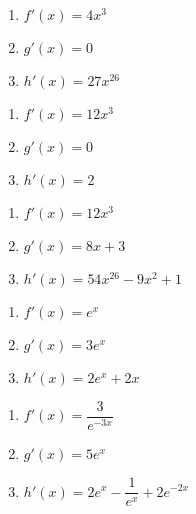 \documentclass[a4paper, 12pt]{article}
\begin{document}
\begin{facit}
    \begin{multicols}{3}
        \begin{enumerate}
            \item $f'(x) = 4x^3$
            \item $g'(x) = 0$
            \item $h'(x) = 27x^{26}$
        \end{enumerate}
    \end{multicols}
\end{facit}

\begin{facit}
    \begin{multicols}{3}
        \begin{enumerate}
            \item $f'(x) = 12x^3$
            \item $g'(x) = 0$
            \item $h'(x) = 2$
        \end{enumerate}
    \end{multicols}
\end{facit}

\begin{facit}
    \begin{multicols}{3}
        \begin{enumerate}
            \item $f'(x) = 12x^3$
            \item $g'(x) = 8x + 3$
            \item $h'(x) = 54x^{26} - 9x^2 + 1$
        \end{enumerate}
    \end{multicols}
\end{facit}


\begin{facit}
    \begin{multicols}{3}
        \begin{enumerate}
            \item $f'(x) = e^x$
            \item $g'(x) = 3e^x$
            \item $h'(x) = 2e^x + 2x$
        \end{enumerate}
    \end{multicols}
\end{facit}

\begin{facit}
    \begin{multicols}{3}
        \begin{enumerate}
            \item $f'(x) = \dfrac{3}{e^{-3x}}$
            \item $g'(x) = 5e^x$
            \item $h'(x) = 2e^x - \dfrac 1{e^x} + 2e^{-2x}$
        \end{enumerate}
    \end{multicols}
\end{facit}
\end{document}
